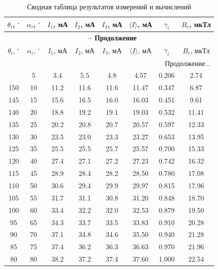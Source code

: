\documentclass[a4paper,12pt]{article}
\begin{document}
\begin{longtable}{|c|c|c|c|c|c|c|c|}
    \caption{Сводная таблица результатов измерений и вычислений} \label{tab:full_data} \\
    \hline
    $\theta_i$, $^\circ$ & $\alpha_i$, $^\circ$ & $I_1$, мА & $I_2$, мА & $I_3$, мА & $\langle I \rangle$, мА & $\gamma_i$ & $B_c$, мкТл \\ \hline
    \endfirsthead
    \multicolumn{8}{c}{{\bfseries \tablename\ \thetable{} -- Продолжение}} \\ \hline
    $\theta_i$, $^\circ$ & $\alpha_i$, $^\circ$ & $I_1$, мА & $I_2$, мА & $I_3$, мА & $\langle I \rangle$, мА & $\gamma_i$ & $B_c$, мкТл \\ \hline
    \endhead
    \hline \multicolumn{8}{|r|}{{Продолжение...}} \\ \hline
    \endfoot
    \hline
    \endlastfoot
    155 & 5 & 3.4 & 5.5 & 4.8 & 4.57 & 0.206 & 2.74 \\ \hline
    150 & 10 & 11.2 & 11.6 & 11.6 & 11.47 & 0.347 & 6.87 \\ \hline
    145 & 15 & 15.6 & 16.5 & 16.0 & 16.03 & 0.451 & 9.61 \\ \hline
    140 & 20 & 18.8 & 19.2 & 19.1 & 19.03 & 0.532 & 11.41 \\ \hline
    135 & 25 & 20.2 & 20.8 & 20.7 & 20.57 & 0.597 & 12.33 \\ \hline
    130 & 30 & 23.5 & 23.0 & 23.3 & 23.27 & 0.653 & 13.95 \\ \hline
    125 & 35 & 25.5 & 25.5 & 25.7 & 25.57 & 0.700 & 15.33 \\ \hline
    120 & 40 & 27.4 & 27.1 & 27.2 & 27.23 & 0.742 & 16.32 \\ \hline
    115 & 45 & 28.9 & 28.4 & 28.2 & 28.50 & 0.780 & 17.08 \\ \hline
    110 & 50 & 30.6 & 29.4 & 29.9 & 29.97 & 0.815 & 17.96 \\ \hline
    105 & 55 & 31.7 & 31.1 & 30.8 & 31.20 & 0.848 & 18.70 \\ \hline
    100 & 60 & 33.4 & 32.2 & 32.0 & 32.53 & 0.879 & 19.50 \\ \hline
    95 & 65 & 34.3 & 33.7 & 33.5 & 33.83 & 0.910 & 20.28 \\ \hline
    90 & 70 & 37.1 & 34.8 & 34.6 & 35.50 & 0.940 & 21.28 \\ \hline
    85 & 75 & 37.4 & 36.2 & 36.3 & 36.63 & 0.970 & 21.96 \\ \hline
    80 & 80 & 38.2 & 37.2 & 37.4 & 37.60 & 1.000 & 22.54 \\ \hline

\end{longtable}
\end{document}
